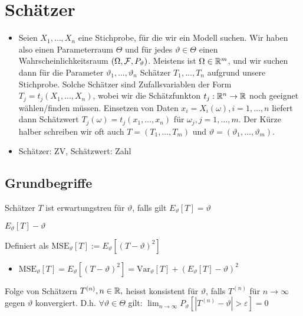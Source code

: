 
\section{Schätzer}
\begin{itemize}
    \item Seien $X_1, \dots, X_n$ eine Stichprobe, für die wir ein Modell suchen. Wir haben also einen Parameterraum $\Theta$ und für jedes $\vartheta \in \Theta$ einen Wahrscheinlichkeitsraum $(\Omega, \mathcal{F}, P_\vartheta)$. Meistens ist $\Omega \in \mathbb{R}^m$, und wir suchen dann für die Parameter $\vartheta_1, \dots, \vartheta_n$ Schätzer $T_1, \dots, T_n$ aufgrund unsere Stichprobe. Solche Schätzer sind Zufallsvariablen der Form $T_j = t_j(X_1, \dots, X_n)$, wobei wir die Schätzfunkton $t_j: \mathbb{R}^n \to \mathbb{R}$ noch geeignet wählen/finden müssen. Einsetzen von Daten $x_i = X_i(\omega), i = 1, \dots, n$ liefert dann Schätzwert $T_j(\omega) = t_j(x_1, \dots, x_n)$ für $\omega_j, j = 1, \dots, m$. Der Kürze halber schreiben wir oft auch $T = (T_1, \dots, T_m)$ und $\vartheta = (\vartheta_1, \dots, \vartheta_m)$.
    \item Schätzer: ZV, Schätzwert: Zahl
\end{itemize}

\subsection{Grundbegriffe}
\begin{itemize}
     Schätzer $T$ ist erwartungstreu für $\vartheta$, falls gilt $E_\vartheta[T] = \vartheta$
        \begin{itemize}
             $E_\vartheta[T] - \vartheta$
        \end{itemize}
     Definiert als $\text{MSE}_\vartheta[T] := E_\vartheta[(T - \vartheta)^2]$
        \begin{itemize}
            \item $\text{MSE}_\vartheta[T] = E_\vartheta[(T - \vartheta)^2] = \text{Var}_\vartheta[T] + (E_\vartheta[T] - \vartheta)^2$
        \end{itemize}
     Folge von Schätzern $T^{(n)}, n \in \mathbb{R},$ heisst konsistent für $\vartheta$, falls $T^{(n)}$ für $n \to \infty$ gegen $\vartheta$ konvergiert. D.h. $\forall \vartheta \in \Theta$ gilt: $\lim_{n \to \infty} P_\vartheta[|T^{(n)} - \vartheta| > \varepsilon] = 0$
\end{itemize}

